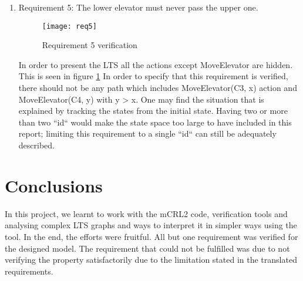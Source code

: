 \begin{enumerate}
\item Requirement 5: The lower elevator must never pass the upper one.

\begin{figure}[h]
\center
\texttt{[image: req5]}
\caption{Requirement 5 verification}
\label{fig:req5}
\end{figure}

In order to present the LTS all the actions except MoveElevator are hidden. This is seen in figure \ref{fig:req5} In order to specify that this requirement is verified, there should not be any path which includes MoveElevator(C3, x) action and MoveElevator(C4, y) with y > x. One may find the situation that is explained by tracking the states from the initial state. Having two or more than two ``id`` would make the state space too large to have included in this report; limiting this requirement to a single ``id``  can still be adequately described.


\end{enumerate}

\section*{Conclusions}
In this project, we learnt to work with the mCRL2 code, verification tools and analysing complex LTS graphs and ways to interpret it in simpler ways using the tool. In the end, the efforts were fruitful. All but one requirement was verified for the designed model. The requirement that could not be fulfilled was due to not verifying the property satisfactorily due to the limitation stated in the translated requirements.